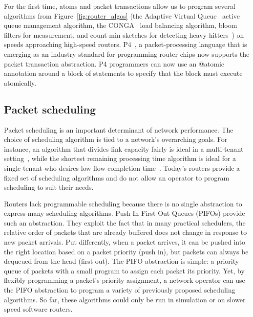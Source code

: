For the first time, atoms and packet transactions allow us to program several
algorithms from Figure~\ref{fig:router_algos} (\eg the Adaptive Virtual
Queue~\cite{avq} active queue management algorithm, the CONGA~\cite{conga} load
balancing algorithm, bloom filters for measurement, and count-min sketches for
detecting heavy hitters~\cite{opensketch}) on speeds approaching high-speed
routers. P4~\cite{p4}, a packet-processing language that is emerging as an
industry standard for programming router chips now supports the packet
transaction abstraction.  P4 programmers can now use an @atomic annotation
around a block of statements to specify that the block must execute atomically.


\subsection{Packet scheduling}

Packet scheduling is an important determinant of network performance. The
choice of scheduling algorithm is tied to a network's overarching goals. For
instance, an algorithm that divides link capacity fairly is ideal in a
multi-tenant setting~\cite{wfq}, while the shortest remaining processing time
algorithm is ideal for a single tenant who desires low flow completion
time~\cite{pFabric}. Today's routers provide a fixed set of scheduling
algorithms and do not allow an operator to program scheduling to suit their
needs.

Routers lack programmable scheduling because there is no single abstraction to
express many scheduling algorithms. Push In First Out Queues (PIFOs) provide
such an abstraction. They exploit the fact that in many practical schedulers,
the relative order of packets that are already buffered does not change in
response to new packet arrivals. Put differently, when a packet arrives, it can
be pushed into the right location based on a packet priority (push in), but
packets can always be dequeued from the head (first out). The PIFO abstraction
is simple: a priority queue of packets with a small program to assign each
packet its priority. Yet, by flexibly programming a packet's priority
assignment, a network operator can use the PIFO abstraction to program a
variety of previously proposed scheduling algorithms. So far, these algorithms
could only be run in simulation or on slower speed software routers.

